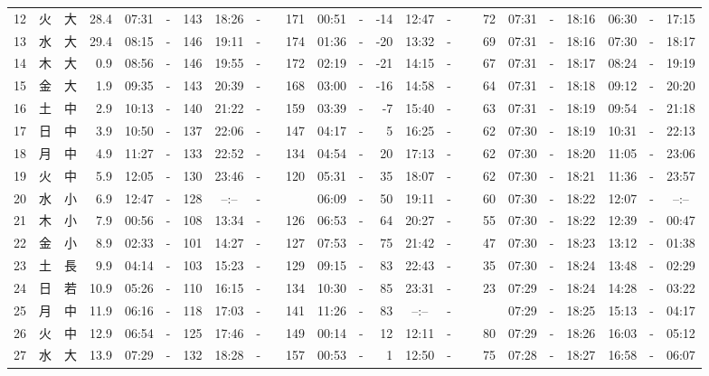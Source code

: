 \documentclass[12pt,a4j]{jsarticle}
\begin{document}
\begin{table}[htbp]
\begin{center}
{\begin{tabular}{|rc|cr|ccrccr|ccrccr|ccc|ccc|}
12 & 火 & 大 & 28.4 &  07:31 &-& 143 &  18:26 &-& 171 &  00:51 &-& -14 &  12:47 &-&  72 & 07:31 & -& 18:16 & 06:30 & -& 17:15 \\
13 & 水 & 大 & 29.4 &  08:15 &-& 146 &  19:11 &-& 174 &  01:36 &-& -20 &  13:32 &-&  69 & 07:31 & -& 18:16 & 07:30 & -& 18:17 \\
14 & 木 & 大 &  0.9 &  08:56 &-& 146 &  19:55 &-& 172 &  02:19 &-& -21 &  14:15 &-&  67 & 07:31 & -& 18:17 & 08:24 & -& 19:19 \\
15 & 金 & 大 &  1.9 &  09:35 &-& 143 &  20:39 &-& 168 &  03:00 &-& -16 &  14:58 &-&  64 & 07:31 & -& 18:18 & 09:12 & -& 20:20 \\
16 & 土 & 中 &  2.9 &  10:13 &-& 140 &  21:22 &-& 159 &  03:39 &-&  -7 &  15:40 &-&  63 & 07:31 & -& 18:19 & 09:54 & -& 21:18 \\
17 & 日 & 中 &  3.9 &  10:50 &-& 137 &  22:06 &-& 147 &  04:17 &-&   5 &  16:25 &-&  62 & 07:30 & -& 18:19 & 10:31 & -& 22:13 \\
18 & 月 & 中 &  4.9 &  11:27 &-& 133 &  22:52 &-& 134 &  04:54 &-&  20 &  17:13 &-&  62 & 07:30 & -& 18:20 & 11:05 & -& 23:06 \\
19 & 火 & 中 &  5.9 &  12:05 &-& 130 &  23:46 &-& 120 &  05:31 &-&  35 &  18:07 &-&  62 & 07:30 & -& 18:21 & 11:36 & -& 23:57 \\
20 & 水 & 小 &  6.9 &  12:47 &-& 128 &  --:-- &-&~~~~~ &  06:09 &-&  50 &  19:11 &-&  60 & 07:30 & -& 18:22 & 12:07 & -& --:-- \\
21 & 木 & 小 &  7.9 &  00:56 &-& 108 &  13:34 &-& 126 &  06:53 &-&  64 &  20:27 &-&  55 & 07:30 & -& 18:22 & 12:39 & -& 00:47 \\
22 & 金 & 小 &  8.9 &  02:33 &-& 101 &  14:27 &-& 127 &  07:53 &-&  75 &  21:42 &-&  47 & 07:30 & -& 18:23 & 13:12 & -& 01:38 \\
23 & 土 & 長 &  9.9 &  04:14 &-& 103 &  15:23 &-& 129 &  09:15 &-&  83 &  22:43 &-&  35 & 07:30 & -& 18:24 & 13:48 & -& 02:29 \\
24 & 日 & 若 & 10.9 &  05:26 &-& 110 &  16:15 &-& 134 &  10:30 &-&  85 &  23:31 &-&  23 & 07:29 & -& 18:24 & 14:28 & -& 03:22 \\
25 & 月 & 中 & 11.9 &  06:16 &-& 118 &  17:03 &-& 141 &  11:26 &-&  83 &  --:-- &-&~~~~~ & 07:29 & -& 18:25 & 15:13 & -& 04:17 \\
26 & 火 & 中 & 12.9 &  06:54 &-& 125 &  17:46 &-& 149 &  00:14 &-&  12 &  12:11 &-&  80 & 07:29 & -& 18:26 & 16:03 & -& 05:12 \\
27 & 水 & 大 & 13.9 &  07:29 &-& 132 &  18:28 &-& 157 &  00:53 &-&   1 &  12:50 &-&  75 & 07:28 & -& 18:27 & 16:58 & -& 06:07 \\

\end{tabular}}
\end{center}
\end{table}
\end{document}
